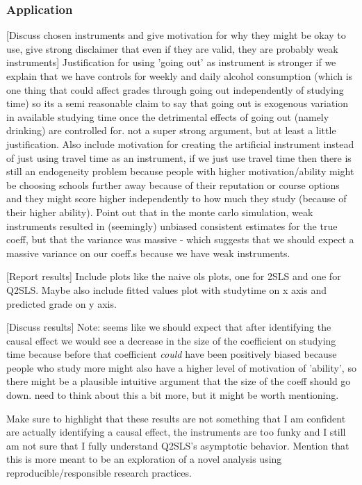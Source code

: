\documentclass[12pt]{article}
\begin{document}
\subsubsection{Application}
\textcolor{BrickRed}{[Discuss chosen instruments and give motivation for why they might be okay to use, give strong disclaimer that even if they are valid, they are probably weak instruments]} Justification for using 'going out' as instrument is stronger if we explain that we have controls for weekly and daily alcohol consumption (which is one thing that could affect grades through going out independently of studying time) so its a semi reasonable claim to say that going out is exogenous variation in available studying time once the detrimental effects of going out (namely drinking) are controlled for. not a super strong argument, but at least a little justification. Also include motivation for creating the artificial instrument instead of just using travel time as an instrument, if we just use travel time then there is still an endogeneity problem because people with higher motivation/ability might be choosing schools further away because of their reputation or course options and they might score higher independently to how much they study (because of their higher ability). Point out that in the monte carlo simulation, weak instruments resulted in (seemingly) unbiased consistent estimates for the true coeff, but that the variance was massive - which suggests that we should expect a massive variance on our coeff.s because we have weak instruments.

\textcolor{BrickRed}{[Report results]} Include plots like the naive ols plots, one for 2SLS and one for Q2SLS. Maybe also include fitted values plot with studytime on x axis and predicted grade on y axis.

\textcolor{BrickRed}{[Discuss results]} Note: seems like we should expect that after identifying the causal effect we would see a decrease in the size of the coefficient on studying time because before that coefficient \textit{could} have been positively biased because people who study more might also have a higher level of motivation of 'ability', so there might be a plausible intuitive argument that the size of the coeff should go down. need to think about this a bit more, but it might be worth mentioning.

Make sure to highlight that these results are not something that I am confident are actually identifying a causal effect, the instruments are too funky and I still am not sure that I fully understand Q2SLS's asymptotic behavior. Mention that this is more meant to be an exploration of a novel analysis using reproducible/responsible research practices.
\end{document}
